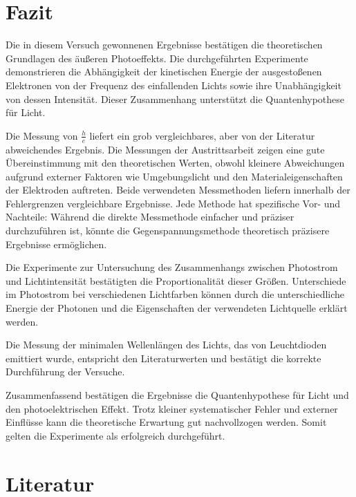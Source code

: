 \documentclass[12pt,a4paper]{scrartcl}
\numberwithin{equation}{section} %
\begin{document}
\clearpage
\hypertarget{fazit}{%
\section{Fazit}\label{fazit}}
Die in diesem Versuch gewonnenen Ergebnisse bestätigen die theoretischen Grundlagen des äußeren Photoeffekts. Die durchgeführten Experimente demonstrieren die Abhängigkeit der kinetischen Energie der ausgestoßenen Elektronen von der Frequenz des einfallenden Lichts sowie ihre Unabhängigkeit von dessen Intensität. Dieser Zusammenhang unterstützt die Quantenhypothese für Licht.

Die Messung von $\frac{h}{e}$ liefert ein grob vergleichbares, aber von der Literatur abweichendes Ergebnis. Die Messungen der Austrittsarbeit zeigen eine gute Übereinstimmung mit den theoretischen Werten, obwohl kleinere Abweichungen aufgrund externer Faktoren wie Umgebungslicht und den Materialeigenschaften der Elektroden auftreten. Beide verwendeten Messmethoden liefern innerhalb der Fehlergrenzen vergleichbare Ergebnisse. Jede Methode hat spezifische Vor- und Nachteile: Während die direkte Messmethode einfacher und präziser durchzuführen ist, könnte die Gegenspannungsmethode theoretisch präzisere Ergebnisse ermöglichen.

Die Experimente zur Untersuchung des Zusammenhangs zwischen Photostrom und Lichtintensität bestätigten die Proportionalität dieser Größen. Unterschiede im Photostrom bei verschiedenen Lichtfarben können durch die unterschiedliche Energie der Photonen und die Eigenschaften der verwendeten Lichtquelle erklärt werden.

Die Messung der minimalen Wellenlängen des Lichts, das von Leuchtdioden emittiert wurde, entspricht den Literaturwerten und bestätigt die korrekte Durchführung der Versuche.

Zusammenfassend bestätigen die Ergebnisse die Quantenhypothese für Licht und den photoelektrischen Effekt. Trotz kleiner systematischer Fehler und externer Einflüsse kann die theoretische Erwartung gut nachvollzogen werden. Somit gelten die Experimente als erfolgreich durchgeführt.

\clearpage
\hypertarget{literatur}{%
\section{Literatur}\label{literatur}}
\renewcommand{\section}[2]{}
\end{document}
